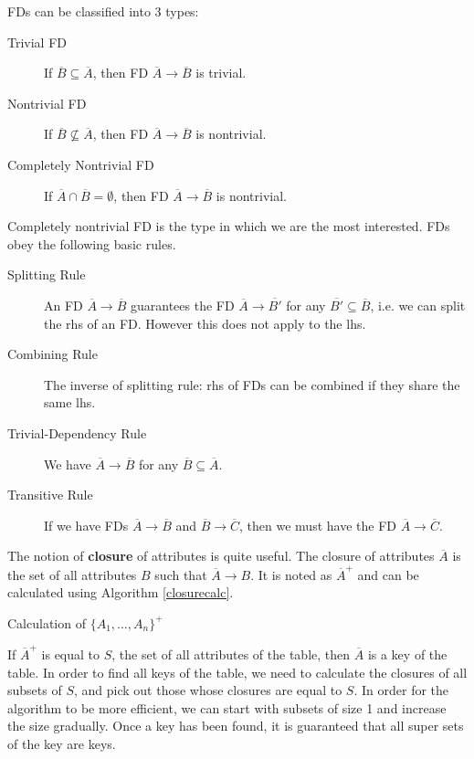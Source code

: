 FDs can be classified into 3 types:
\begin{description}
\item[Trivial FD]If ${\overline{B}\subseteq\overline{A}}$, then FD ${\overline{A}\rightarrow\overline{B}}$ is trivial.
\item[Nontrivial FD]If ${\overline{B}\not\subseteq\overline{A}}$, then FD ${\overline{A}\rightarrow\overline{B}}$ is nontrivial.
\item[Completely Nontrivial FD]If ${\overline{A}\cap\overline{B}=\emptyset}$, then FD ${\overline{A}\rightarrow\overline{B}}$ is nontrivial.
\end{description}
Completely nontrivial FD is the type in which we are the most interested. FDs obey the following basic rules.
\begin{description}
\item[Splitting Rule]An FD ${\overline{A}\rightarrow\overline{B}}$ guarantees the FD ${\overline{A}\rightarrow\overline{B'}}$ for any ${\overline{B'}\subseteq\overline{B}}$, i.e. we can split the rhs of an FD. However this does not apply to the lhs.
\item[Combining Rule]The inverse of splitting rule: rhs of FDs can be combined if they share the same lhs.
\item[Trivial-Dependency Rule]We have ${\overline{A}\rightarrow\overline{B}}$ for any  ${\overline{B}\subseteq\overline{A}}$.
\item[Transitive Rule]If we have FDs ${\overline{A}\rightarrow\overline{B}}$ and ${\overline{B}\rightarrow\overline{C}}$, then we must have the FD ${\overline{A}\rightarrow\overline{C}}$.
\end{description}
The notion of \textbf{closure} of attributes is quite useful. The closure of attributes $\overline{{A}}$ is the set of all attributes $B$ such that ${\overline{A}\rightarrow B}$. It is noted as ${\overline{A}^+}$ and can be calculated using Algorithm \eqref{closurecalc}.
\begin{algorithm}[ht]
\caption{Calculation of ${\{A_1,\dots,A_n\}^+}$}\label{closurecalc}
\begin{algorithmic}
\Repeat
{}
\EndIf
{}
\end{algorithmic}
\end{algorithm}
If ${\overline{A}^+}$ is equal to $S$, the set of all attributes of the table, then ${\overline{A}}$ is a key of the table. In order to find all keys of the table, we need to calculate the closures of all subsets of $S$, and pick out those whose closures are equal to $S$. In order for the algorithm to be more efficient, we can start with subsets of size 1 and increase the size gradually. Once a key has been found, it is guaranteed that all super sets of the key are keys.


